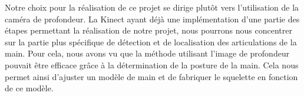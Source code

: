 Notre choix pour la réalisation de ce projet se dirige plutôt vers l'utilisation de la caméra de profondeur.
La Kinect ayant déjà une implémentation d'une partie des étapes permettant la réalisation de notre projet, nous pourrons
nous concentrer sur la partie plus spécifique de détection et de localisation des articulations de la main. 
Pour cela, nous avons vu que la méthode utilisant l'image de profondeur pouvait être efficace grâce à la 
détermination de la posture de la main. Cela nous permet ainsi d'ajuster un modèle de main et de fabriquer
le squelette en fonction de ce modèle.\\
